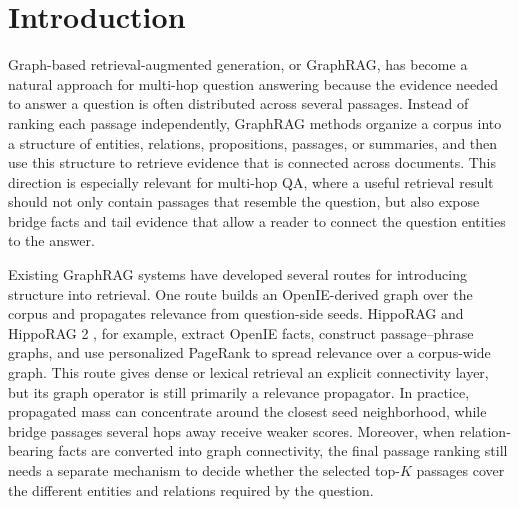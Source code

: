%
%

\section{Introduction}
\label{sec:intro}

Graph-based retrieval-augmented generation, or GraphRAG, has become a
natural approach for multi-hop question answering because the evidence
needed to answer a question is often distributed across several
passages. Instead of ranking each passage independently, GraphRAG methods
organize a corpus into a structure of entities, relations, propositions,
passages, or summaries, and then use this structure to retrieve evidence
that is connected across documents. This direction is especially relevant
for multi-hop QA, where a useful retrieval result should not only contain
passages that resemble the question, but also expose bridge facts and
tail evidence that allow a reader to connect the question entities to the
answer.

Existing GraphRAG systems have developed several routes for introducing
structure into retrieval. One route builds an OpenIE-derived graph over
the corpus and propagates relevance from question-side seeds. HippoRAG
and HippoRAG 2 \citep{jimenez2024hipporag,gutierrez2025hipporag}, for
example, extract OpenIE facts, construct passage--phrase graphs, and use
personalized PageRank to spread relevance over a corpus-wide graph. This
route gives dense or lexical retrieval an explicit connectivity layer,
but its graph operator is still primarily a relevance propagator. In
practice, propagated mass can concentrate around the closest seed
neighborhood, while bridge passages several hops away receive weaker
scores. Moreover, when relation-bearing facts are converted into graph
connectivity, the final passage ranking still needs a separate mechanism
to decide whether the selected top-$K$ passages cover the different
entities and relations required by the question.

